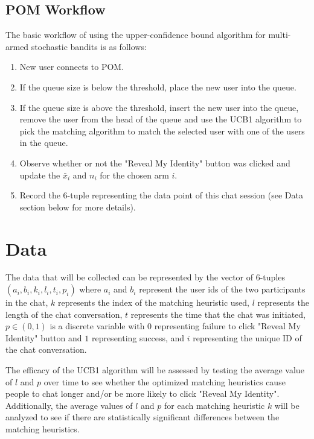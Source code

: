 \documentclass{article}
\begin{document}
\subsection{POM Workflow}

The basic workflow of using the upper-confidence bound algorithm for multi-armed stochastic bandits is as follows: 

\begin{enumerate}
\item New user connects to POM.
\item If the queue size is below the threshold, place the new user into the queue.
\item If the queue size is above the threshold, insert the new user into the queue, remove the user from the head of the queue and use the UCB1 algorithm to pick the matching algorithm to match the selected user with one of the users in the queue. 
\item Observe whether or not the "Reveal My Identity" button was clicked and update the $\bar{x}_i$ and $n_i$ for the chosen arm $i$.
\item Record the 6-tuple representing the data point of this chat session (see Data section below for more details).
\end{enumerate}

\section{Data}

The data that will be collected can be represented by the vector of 6-tuples $(a_i, b_i, k_i, l_i, t_i, p_i)$ where $a_i$ and $b_i$ represent the user ids of the two participants in the chat, $k$ represents the index of the matching heuristic used, $l$ represents the length of the chat conversation, $t$ represents the time that the chat was initiated, $p \in{(0, 1)} $ is a discrete variable with $0$ representing failure to click "Reveal My Identity" button and $1$ representing success, and $i$ representing the unique ID of the chat conversation.

The efficacy of the UCB1 algorithm will be assessed by testing the average value of $l$ and $p$ over time to see whether the optimized matching heuristics cause people to chat longer and/or be more likely to click "Reveal My Identity". Additionally, the average values of $l$ and $p$ for each matching heuristic $k$ will be analyzed to see if there are statistically significant differences between the matching heuristics.
\end{document}
